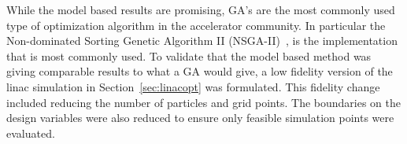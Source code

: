  \label{sec:ga}
While the model based results are promising, 
GA's are the most commonly used type of optimization algorithm in the accelerator community.
In particular the Non-dominated Sorting Genetic Algorithm II (NSGA-II)~\cite{NSGA}, 
is the implementation that is most commonly used.
To validate that the model based method was giving comparable results to what a GA would give, 
a low fidelity version of the linac simulation in Section~\ref{sec:linacopt} was formulated.
This fidelity change included reducing the number of particles and grid points. 
The boundaries on the design variables were also reduced to ensure only 
feasible simulation points were evaluated.

